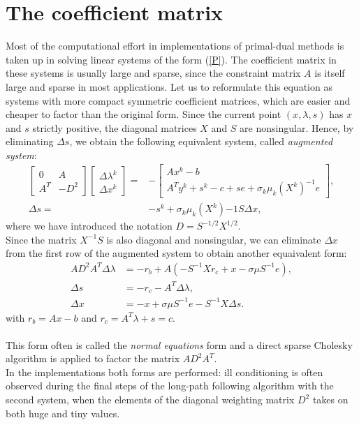 \documentclass[a4paper,10 pt,titlepage,twoside]{book}
\theoremstyle{plain}
\theoremstyle{definition}
\theoremstyle{remark}
\begin{document}
\section*{The coefficient matrix}
Most of the computational effort in implementations of primal-dual methods is taken up in solving linear systems of the form (\ref{P}). The
coefficient matrix in these systems is usually large and sparse, since the constraint
matrix $A$ is itself large and sparse in most applications. Let us to reformulate
this equation as systems with more compact symmetric coefficient matrices, which
are easier and cheaper to factor than the original form. Since the current point $(x, \lambda, s)$ has $x$ and $s$ strictly
positive, the diagonal matrices $X$ and $S$ are nonsingular. Hence, by eliminating $\Delta s$, we obtain the following equivalent system, called \textit{augmented system}:
\begin{align*}
\begin{bmatrix}
0&A\\A^{T}&-D^{2}
\end{bmatrix}\begin{bmatrix}
\Delta\lambda^{k} \\\Delta x^{k}
\end{bmatrix}=&-\begin{bmatrix}
Ax^{k}-b\\A^{T}y^{k}+s^{k}-c+ se + \sigma_{k}\mu_{k}(X^{k})^{-1}e
\end{bmatrix},\\
\Delta s =& -s^{k} +\sigma_{k}\mu_{k} (X^{k}){-1}S\Delta x,
\end{align*}
where we have introduced the notation $D = S^{-1/2}X^{1/2}$.\\
Since the matrix $X^{-1}S$ is also diagonal and nonsingular, we can eliminate $\Delta x$ from the first row of the augmented system to obtain another equaivalent form:
\begin{align*}
AD^{2}A^{T}\Delta\lambda &= -r_{b}+A(-S^{-1}Xr_{c}+ x - \sigma\mu S^{-1}e),\\
\Delta s &= -r_{c}-A^{T}\Delta \lambda,\\
\Delta x &= -x + \sigma \mu S^{-1}e-S^{-1}X\Delta s.
\end{align*}
with $r_{b} = Ax - b$ and $r_{c}= A^{T}\lambda +s = c$.\\
\\
This form often is called the \textit{normal equations} form and a direct sparse Cholesky algorithm is applied to factor the matrix $AD^{2}A^{T}$. \\In the implementations both forms are performed: ill conditioning is often observed during the final
steps of the long-path following algorithm with the second system, when the elements of the diagonal weighting
matrix $D^{2}$ takes on both huge and tiny values.
\end{document}
